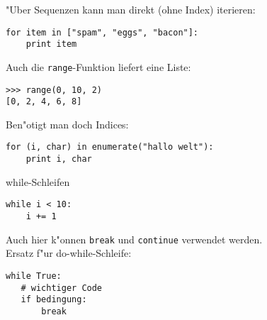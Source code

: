 \begin{frame}[fragile]
"Uber Sequenzen kann man direkt (ohne Index) iterieren:
\begin{lstlisting}[style=Python]
for item in ["spam", "eggs", "bacon"]:
    print item
\end{lstlisting}

Auch die \texttt{range}-Funktion liefert eine Liste:
\begin{lstlisting}[style=Shell]
>>> range(0, 10, 2)
[0, 2, 4, 6, 8]
\end{lstlisting}
Ben"otigt man doch Indices:
\begin{lstlisting}[style=Python]
for (i, char) in enumerate("hallo welt"):
    print i, char
\end{lstlisting}
\end{frame}

\begin{frame}[fragile]{while-Schleifen}
\begin{lstlisting}[style=Python]
while i < 10:
    i += 1
\end{lstlisting}
Auch hier k"onnen \lstinline{break} und \lstinline{continue} verwendet werden.\\[3mm]
Ersatz f"ur do-while-Schleife:
\begin{lstlisting}[style=Python]
while True:
   # wichtiger Code
   if bedingung:
       break
\end{lstlisting} 
\end{frame}

